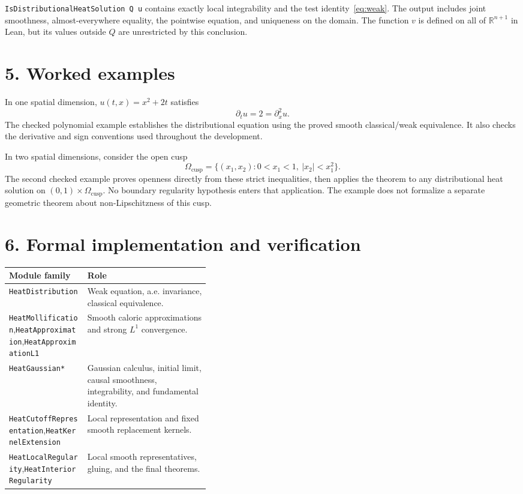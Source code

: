 \documentclass[11pt,letterpaper]{article}
\newcommand{\R}{\mathbb R}
\begin{document}
\texttt{IsDistributionalHeatSolution Q u} contains exactly local integrability
and the test identity~\eqref{eq:weak}. The output includes joint smoothness,
almost-everywhere equality, the pointwise equation, and uniqueness on the domain.
The function $v$ is defined on all of $\R^{n+1}$ in Lean, but its values outside
$Q$ are unrestricted by this conclusion.

\newpage
\section*{5. Worked examples}
In one spatial dimension, $u(t,x)=x^2+2t$ satisfies
\[
  \partial_tu=2=\partial_x^2u.
\]
The checked polynomial example establishes the distributional equation using
the proved smooth classical/weak equivalence. It also checks the derivative
and sign conventions used throughout the development.

In two spatial dimensions, consider the open cusp
\[
 \Omega_{\mathrm{cusp}}=
 \{(x_1,x_2):0<x_1<1,\ |x_2|<x_1^2\}.
\]
The second checked example proves openness directly from these strict
inequalities, then applies the theorem to any distributional heat solution on
$(0,1)\times\Omega_{\mathrm{cusp}}$. No boundary regularity hypothesis enters
that application. The example does not formalize a separate geometric theorem
about non-Lipschitzness of this cusp.

\section*{6. Formal implementation and verification}\label{sec:verification}
\begin{tabularx}{\linewidth}{@{}p{0.39\linewidth}X@{}}
\toprule
\textbf{Module family} & \textbf{Role}\\\midrule
\texttt{HeatDistribution} & Weak equation, a.e. invariance, classical equivalence.\\
\texttt{HeatMollification},\newline\texttt{HeatApproximation},\newline\texttt{HeatApproximationL1} & Smooth caloric approximations and strong $L^1$ convergence.\\
\texttt{HeatGaussian*} & Gaussian calculus, initial limit, causal smoothness, integrability, and fundamental identity.\\
\texttt{HeatCutoffRepresentation},\newline\texttt{HeatKernelExtension} & Local representation and fixed smooth replacement kernels.\\
\texttt{HeatLocalRegularity},\newline\texttt{HeatInteriorRegularity} & Local smooth representatives, gluing, and the final theorems.\\
\bottomrule
\end{tabularx}
\end{document}
